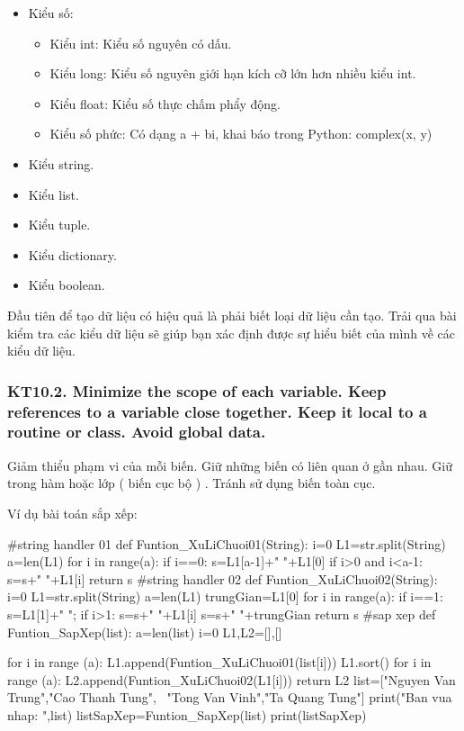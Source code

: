 \documentclass[12pt]{report}
\begin{document}
\begin{itemize}
	\item Kiểu số:
	\begin{itemize}
		\item Kiểu int: Kiểu số nguyên có dấu. 
		\item Kiểu long: Kiểu số nguyên giới hạn kích cỡ lớn hơn nhiều kiểu int. 
		\item Kiểu float: Kiểu số thực chấm phẩy động. 
		\item Kiểu số phức: Có dạng a + bi, khai báo trong Python: complex(x, y)
	\end{itemize}	
	
	\item Kiểu string. 
	\item Kiểu list.
	\item Kiểu tuple. 
	\item Kiểu dictionary. 
	\item Kiểu boolean. 		
\end{itemize}
Đầu tiên để tạo dữ liệu có hiệu quả là phải biết loại dữ liệu cần tạo. Trải qua bài kiểm tra các
kiểu dữ liệu sẽ giúp bạn xác định được sự hiểu biết của mình về các kiểu dữ liệu.

\subsubsection{KT10.2. Minimize the scope of each variable. Keep references to a variable close together. Keep it local to a routine or class. Avoid global data.}
Giảm thiểu phạm vi của mỗi biến. Giữ những biến có liên quan ở gần nhau. Giữ trong hàm hoặc
lớp ( biến cục bộ ) . Tránh sử dụng biến toàn cục.
\vspace*{3mm}

Ví dụ bài toán sắp xếp: 
\begin{python}
#string handler 01
def Funtion_XuLiChuoi01(String):
    i=0
    L1=str.split(String)
    a=len(L1)
    for i in range(a):
        if i==0:
            s=L1[a-1]+" "+L1[0]
        if i>0 and i<a-1:
            s=s+" "+L1[i]
    return s
#string handler 02
def Funtion_XuLiChuoi02(String):
    i=0
    L1=str.split(String)
    a=len(L1)
    trungGian=L1[0]
    for i in range(a):
        if i==1:
            s=L1[1]+" ";
        if i>1:
            s=s+" "+L1[i]
    s=s+" "+trungGian
    return s
#sap xep
def Funtion_SapXep(list):
    a=len(list)
    i=0
    L1,L2=[],[]

    for i in range (a):
            L1.append(Funtion_XuLiChuoi01(list[i]))
    L1.sort()
    for i in range (a):
        L2.append(Funtion_XuLiChuoi02(L1[i]))
    return L2
list=["Nguyen Van Trung","Cao Thanh Tung", 	\
		"Tong Van Vinh","Ta Quang Tung"]
print("Ban vua nhap: ",list)
listSapXep=Funtion_SapXep(list)
print(listSapXep)
\end{python}
\end{document}
